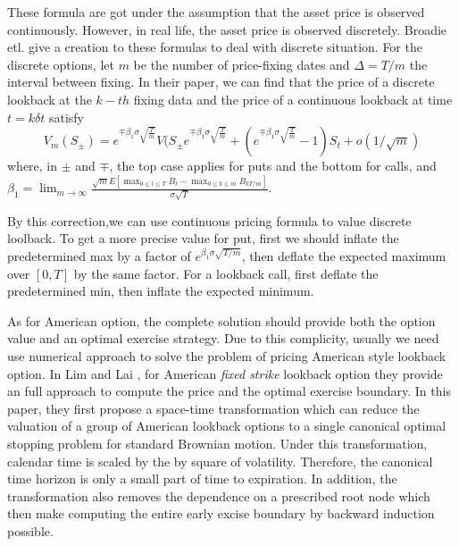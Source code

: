 \documentclass[11pt]{book}
\begin{document}
These formula are got under the assumption that the asset price is observed continuously. However, in real life, the asset price is observed discretely. Broadie etl. \cite{Broadie1999} give a creation to these formulas to deal with discrete situation. For the discrete options, let $m$ be the number of price-fixing dates and $\Delta = T/m$ the interval between fixing. In their paper, we can find that the price of a discrete lookback at the $k-th$ fixing data and the price of a continuous lookback at time $t = k \delta t$ satisfy
\begin{equation}\label{eq:7}
V_m (S_\pm)
=
e^{\mp\beta_1 \sigma \sqrt{\frac{T}{m}}}
V(S_{\pm}e^{\mp\beta _1 \sigma \sqrt{\frac{T}{m}}} +
(e^{\mp \beta_1 \sigma \sqrt{\frac{T}{m}}} -1)S_t + o(1/\sqrt{m})
\end{equation}
where, in $\pm$ and $\mp$, the top case applies for puts and the bottom for calls, and $\beta_1 = \lim_{m\to\infty} \frac{\sqrt{m}E[\max_{0\leq t \leq T} B_t - \max_{0\leq k \leq m} B_{kT/m}]}{\sigma \sqrt{T}}$.

By this correction,we can use continuous pricing formula
to value discrete loolback. To get a more precise value for put,
first we should inflate the predetermined max by a factor of
$e^{\beta_1 \sigma \sqrt{T/m}}$,
then deflate the expected maximum over $[0,T]$ by the same factor. For a lookback call, first deflate the predetermined min, then inflate the expected minimum.

As for American option, the complete solution should provide both the option value and an optimal exercise strategy. Due to this complicity, usually we need use numerical approach to solve the problem of pricing American style lookback option. In Lim and Lai \cite{Lim2004}, for American \emph {fixed strike} lookback option they provide an full approach to compute the price and the optimal exercise boundary. In this paper, they first propose a space-time transformation which can reduce the valuation of a group of American lookback options to a single canonical optimal stopping problem for standard Brownian motion. Under this transformation, calendar time is scaled by the by square of volatility. Therefore, the canonical time horizon is only a small part of time to expiration. In addition, the transformation also removes the dependence on a prescribed root node which then make computing the entire early excise boundary by backward induction possible.

\end{document}
